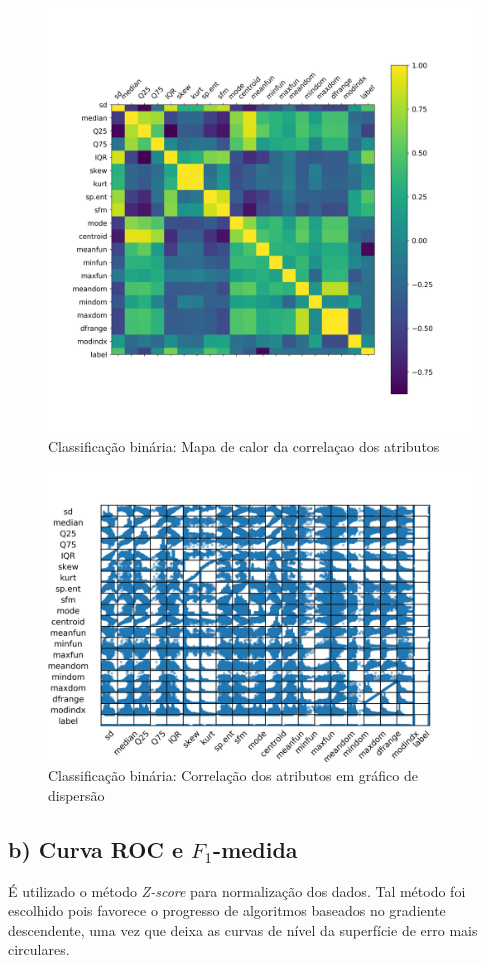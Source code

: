 \documentclass{article}
\begin{document}
        \begin{figure}[H]
            \centering
            \includegraphics[width=.8\linewidth]{img1/data_corr.png}
            \caption{Classificação binária: Mapa de calor da correlaçao dos atributos}
            \label{fig:a_corr_heat}
        \end{figure}
        \begin{figure}[H]
            \centering
            \includegraphics[width=\textwidth]{img1/data_corr_scatter.png}
            \caption{Classificação binária: Correlação dos atributos em gráfico de dispersão }
            \label{fig:a_corr_scatter}
        \end{figure}
    \subsection[]{b) Curva ROC e $F_1$-medida}
        É utilizado o método \textit{Z-score} para normalização dos dados. Tal método foi escolhido
        pois favorece o progresso de algoritmos baseados no gradiente descendente, uma vez que deixa as curvas de nível
        da superfície de erro mais circulares.
\end{document}
